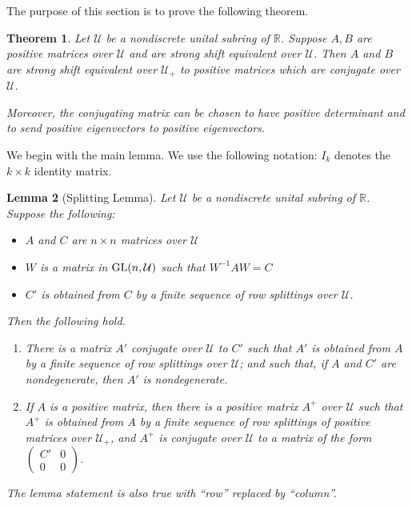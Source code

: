 \documentclass{amsart}
\newtheorem{theorem}{Theorem}[section]
\newtheorem{lemma}[theorem]{Lemma}
\theoremstyle{definition}
\theoremstyle{remark}
\numberwithin{equation}{section}
\begin{document}
{The purpose of this section is to prove 
the following theorem. 


\begin{theorem} \label{ssetosim} 
Let $\mathcal U$ be 
a nondiscrete unital subring 
of $\mathbb{R}$. Suppose 
 $A,B$ are positive matrices over $\mathcal U$ 
and are strong shift equivalent over $\mathcal U$. 
Then $A$ and $ B$ are 
strong shift equivalent over $\mathcal U_+$ to positive matrices 
which are conjugate  over $\mathcal U$.

Moreover, the conjugating matrix can be chosen
to have positive determinant and to send positive 
eigenvectors to positive eigenvectors.
\end{theorem} 

We begin with the main lemma. We use the following notation: 
$I_k$ denotes the $k\times k$ identity matrix. 

\begin{lemma}[Splitting Lemma]
\label{positivitysplittinglemma}
Let  $\mathcal U$ be a nondiscrete unital subring of 
$\mathbb R$.  
Suppose the following: 
\begin{itemize} 
\item 
$A$ and $C$ are $n\times n$ matrices over $\mathcal U$
\item 
$W$ is a matrix in $\textnormal{GL}(n,\mathcal U)$ such that  
$W^{-1}AW=C $
\item 
$C'$ is obtained from $C$ by a finite sequence of 
  row 
splittings over $\mathcal U$. 
\end{itemize} 
Then the following hold. 
\begin{enumerate} 
\item 
There is a matrix $A'$ conjugate  over $\mathcal U$ 
to $C'$ such that $A'$ is obtained from $A$
by a finite sequence 
of row splittings  over $\mathcal U$; 
and such that,  if $A$ and 
$C'$ are nondegenerate,  
then  $A'$ is nondegenerate. 
\item 
If $A$ is a positive matrix, then there is a 
positive matrix $A^+$ over $\mathcal U$ 
such that $A^+$ is obtained 
 from $A$ by a finite sequence 
of row splittings of positive matrices over 
$\mathcal U_+$, and $A^+$ is conjugate over 
$\mathcal U$ to a matrix of the form 
$\left(\begin{smallmatrix} C' & 0 \\ 0& 0 
\end{smallmatrix}\right)$.  
\end{enumerate} 
The lemma statement is also true with ``row'' replaced by 
``column''. 
\end{lemma} 
 
}
\end{document}
